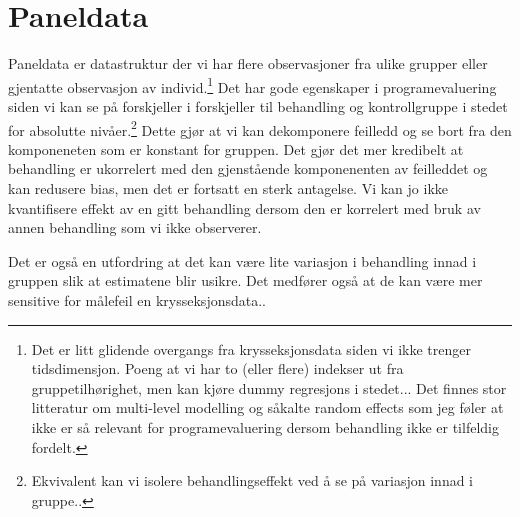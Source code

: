 \section{Paneldata}
Paneldata er datastruktur der vi har flere observasjoner fra ulike grupper eller gjentatte observasjon av individ.\footnote{Det er litt glidende overgangs fra krysseksjonsdata siden vi ikke trenger tidsdimensjon. Poeng at vi har to (eller flere) indekser ut fra gruppetilhørighet, men kan kjøre dummy regresjons i stedet... Det finnes stor litteratur om multi-level modelling og såkalte random effects som jeg føler at ikke er så relevant for programevaluering dersom behandling ikke er tilfeldig fordelt.} Det har gode egenskaper i programevaluering siden vi kan se på forskjeller i forskjeller til behandling og kontrollgruppe i stedet for absolutte nivåer.\footnote{Ekvivalent kan vi isolere behandlingseffekt ved å se på variasjon innad i gruppe..} Dette gjør at vi kan dekomponere feilledd og se bort fra den komponeneten som er konstant for gruppen. Det gjør det mer kredibelt at behandling er ukorrelert med den gjenstående komponenenten av feilleddet og kan redusere bias, men det er fortsatt en sterk antagelse. Vi kan jo ikke kvantifisere effekt av en gitt behandling dersom den er korrelert med bruk av annen behandling som vi ikke observerer.

Det er også en utfordring at det kan være lite variasjon i behandling innad i gruppen slik at estimatene blir usikre. Det medfører også at de kan være mer sensitive for målefeil en krysseksjonsdata..
